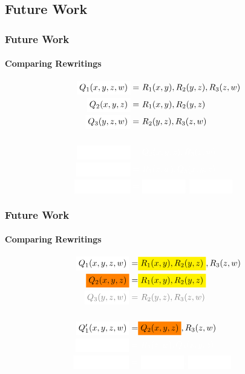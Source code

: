 \documentclass[
	11pt, %
]{beamer}
\begin{document}
\subsection{Future Work}
\begin{frame}
	\frametitle{Future Work }
	\framesubtitle{Comparing Rewritings}
	\begin{align*}
		\colorbox{white}{$Q_1(x,y,z,w)$} =&\  R_1(x,y), R_2(y,z), R_3(z,w)\\
		\colorbox{white}{$Q_2(x,y,z)$} =&\  R_1(x,y), R_2(y,z)\\
		\colorbox{white}{$Q_3(y,z,w)$}=&\ R_2(y,z), R_3(z,w)\\\\
		\color{white}\colorbox{white}{$Q_1'(x,y,z,w)$} =&\color{white}\ Q_2(x,y,z), R_3(z,w)\\
		\color{white}\colorbox{white}{$Q_1''(x,y,z,w)$} =&\color{white}\ R_1(z,w), Q_3(x,y,z)\\
		\color{white}\colorbox{white}{$Q_1'''(x,y,z,w)$} =& \color{white}\ \colorbox{white}{$Q_2(x,y,z)$}, \colorbox{white}{$Q_3(x,y,z)$}
	\end{align*}
\end{frame}
\begin{frame}
	\frametitle{Future Work }
	\framesubtitle{Comparing Rewritings}
	\begin{align*}
		\colorbox{white}{$Q_1(x,y,z,w)$} =&  \colorbox{yellow}{$R_1(x,y), R_2(y,z)$}, R_3(z,w)\\
		\colorbox{orange}{$Q_2(x,y,z)$} =& \colorbox{yellow}{$R_1(x,y), R_2(y,z)$}\\
		\color{gray} \colorbox{white}{$Q_3(y,z,w)$} =&  \color{gray}\ R_2(y,z), R_3(z,w)\\\\
		\colorbox{white}{$Q_1'(x,y,z,w)$} =& \colorbox{orange}{$Q_2(x,y,z)$}, R_3(z,w)\\
		\color{white}\colorbox{white}{$Q_1''(x,y,z,w)$} =&\color{white}\ R_1(z,w), Q_3(x,y,z)\\
		\color{white}\colorbox{white}{$Q_1'''(x,y,z,w)$} =& \color{white}\ \colorbox{white}{$Q_2(x,y,z)$}, \colorbox{white}{$Q_3(x,y,z)$}
	\end{align*}
\end{frame}
\end{document}
